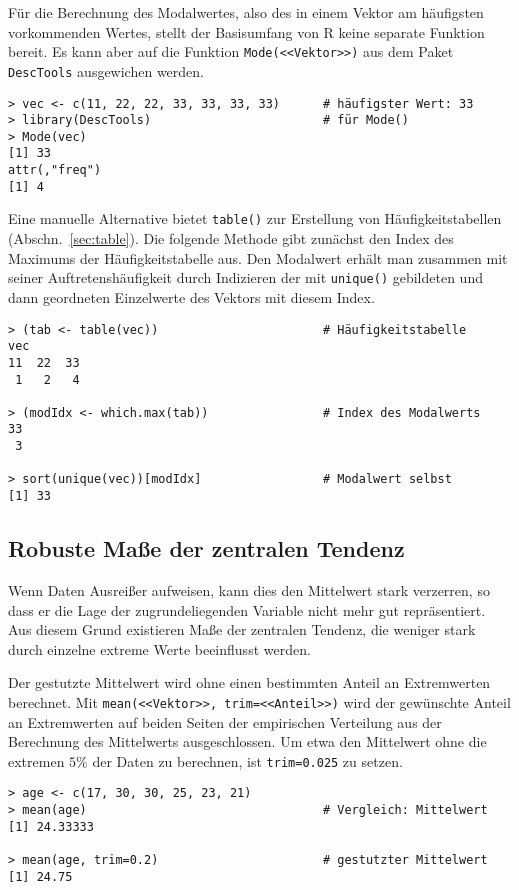 Für die Berechnung des Modalwertes, also des in einem Vektor am häufigsten vorkommenden Wertes, stellt der Basisumfang von R keine separate Funktion bereit. Es kann aber auf die Funktion \lstinline!Mode(<<Vektor>>)! aus dem Paket \lstinline!DescTools! ausgewichen werden.
\begin{lstlisting}
> vec <- c(11, 22, 22, 33, 33, 33, 33)      # häufigster Wert: 33
> library(DescTools)                        # für Mode()
> Mode(vec)
[1] 33
attr(,"freq")
[1] 4
\end{lstlisting}

Eine manuelle Alternative bietet \lstinline!table()! zur Erstellung von Häufigkeitstabellen (Abschn.\ \ref{sec:table}). Die folgende Methode gibt zunächst den Index des Maximums der Häufigkeitstabelle aus. Den Modalwert erhält man zusammen mit seiner Auftretenshäufigkeit durch Indizieren der mit \lstinline!unique()! gebildeten und dann geordneten Einzelwerte des Vektors mit diesem Index.
\begin{lstlisting}
> (tab <- table(vec))                       # Häufigkeitstabelle
vec
11  22  33
 1   2   4

> (modIdx <- which.max(tab))                # Index des Modalwerts
33
 3

> sort(unique(vec))[modIdx]                 # Modalwert selbst
[1] 33
\end{lstlisting}

\subsection{Robuste Maße der zentralen Tendenz}
\label{sec:meanRob}

Wenn Daten Ausreißer aufweisen, kann dies den Mittelwert stark verzerren, so dass er die Lage der zugrundeliegenden Variable nicht mehr gut repräsentiert. Aus diesem Grund existieren Maße der zentralen Tendenz, die weniger stark durch einzelne extreme Werte beeinflusst werden.

Der gestutzte Mittelwert wird ohne einen bestimmten Anteil an Extremwerten berechnet. Mit \lstinline!mean(<<Vektor>>, trim=<<Anteil>>)! wird der gewünschte Anteil an Extremwerten auf beiden Seiten der empirischen Verteilung aus der Berechnung des Mittelwerts ausgeschlossen. Um etwa den Mittelwert ohne die extremen $5\%$ der Daten zu berechnen, ist \lstinline!trim=0.025! zu setzen.
\begin{lstlisting}
> age <- c(17, 30, 30, 25, 23, 21)
> mean(age)                                 # Vergleich: Mittelwert
[1] 24.33333

> mean(age, trim=0.2)                       # gestutzter Mittelwert
[1] 24.75
\end{lstlisting}

